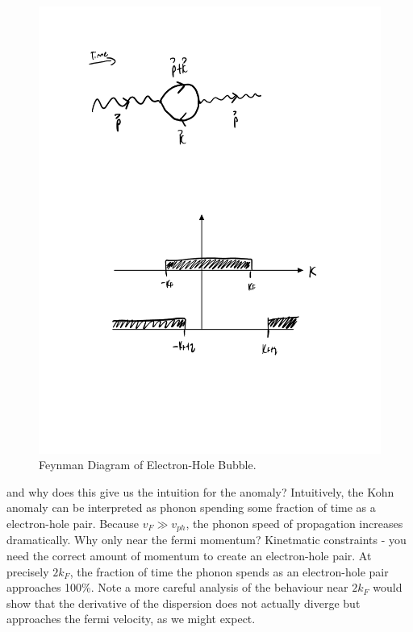 \begin{figure}[htbp]
    \centering
    \includegraphics[scale=0.8]{Images/fig-electronholebubble.pdf}
    \caption{Feynman Diagram of Electron-Hole Bubble.}
    \label{fig-electronholebubble}
\end{figure}

and why does this give us the intuition for the anomaly? Intuitively, the Kohn anomaly can be interpreted as phonon spending some fraction of time as a electron-hole pair. Because $v_F \gg v_{ph}$, the phonon speed of propagation increases dramatically. Why only near the fermi momentum? Kinetmatic constraints - you need the correct amount of momentum to create an electron-hole pair. At precisely $2k_F$, the fraction of time the phonon spends as an electron-hole pair approaches 100\%. Note a more careful analysis of the behaviour near $2k_F$ would show that the derivative of the dispersion does not actually diverge but approaches the fermi velocity, as we might expect.

